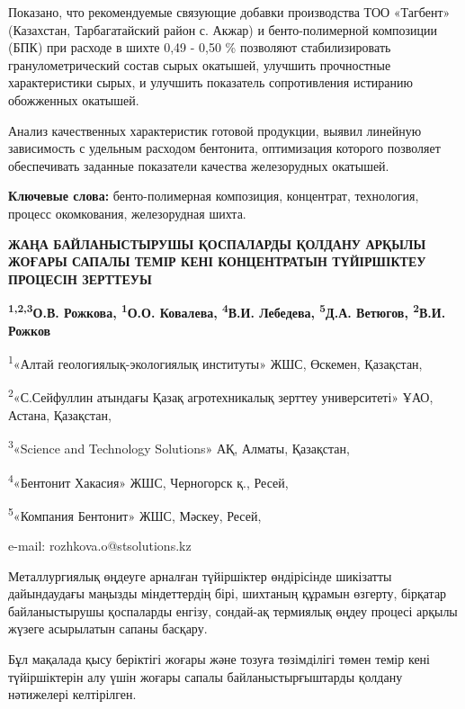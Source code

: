 Показано, что рекомендуемые связующие добавки производства ТОО «Тагбент»
(Казахстан, Тарбагатайский район с. Акжар) и бенто-полимерной композиции
(БПК) при расходе в шихте 0,49 - 0,50 \% позволяют стабилизировать
гранулометрический состав сырых окатышей, улучшить прочностные
характеристики сырых, и улучшить показатель сопротивления истиранию
обожженных окатышей.

Анализ качественных характеристик готовой продукции, выявил линейную
зависимость с удельным расходом бентонита, оптимизация которого
позволяет обеспечивать заданные показатели качества железорудных
окатышей.

{\bfseries Ключевые слова:} бенто-полимерная композиция, концентрат,
технология, процесс окомкования, железорудная шихта.

\begin{articleheader}
{\bfseries ЖАҢА БАЙЛАНЫСТЫРУШЫ ҚОСПАЛАРДЫ ҚОЛДАНУ АРҚЫЛЫ ЖОҒАРЫ САПАЛЫ ТЕМІР КЕНІ КОНЦЕНТРАТЫН ТҮЙІРШІКТЕУ ПРОЦЕСІН ЗЕРТТЕУЫ}

{\bfseries
\textsuperscript{1,2,3}О.В. Рожкова\textsuperscript{\envelope },
\textsuperscript{1}О.О. Ковалева,
\textsuperscript{4}В.И. Лебедева,
\textsuperscript{5}Д.А. Ветюгов,
\textsuperscript{2}В.И. Рожков
}
\end{articleheader}

\begin{affiliation}
\textsuperscript{1}«Алтай геологиялық-экологиялық институты» ЖШС, Өскемен, Қазақстан,

\textsuperscript{2}«С.Сейфуллин атындағы Қазақ агротехникалық зерттеу университеті» ҰАО, Астана, Қазақстан,

\textsuperscript{3}«Science and Technology Solutions» АҚ, Алматы, Қазақстан,

\textsuperscript{4}«Бентонит Хакасия» ЖШС, Черногорск қ., Ресей,

\textsuperscript{5}«Компания Бентонит» ЖШС, Мәскеу, Ресей,

e-mail: rozhkova.o@stsolutions.kz
\end{affiliation}

Металлургиялық өңдеуге арналған түйіршіктер өндірісінде шикізатты
дайындаудағы маңызды міндеттердің бірі, шихтаның құрамын өзгерту,
бірқатар байланыстырушы қоспаларды енгізу, сондай-ақ термиялық өңдеу
процесі арқылы жүзеге асырылатын сапаны басқару.

Бұл мақалада қысу беріктігі жоғары және тозуға төзімділігі төмен темір
кені түйіршіктерін алу үшін жоғары сапалы байланыстырғыштарды қолдану
нәтижелері келтірілген.

